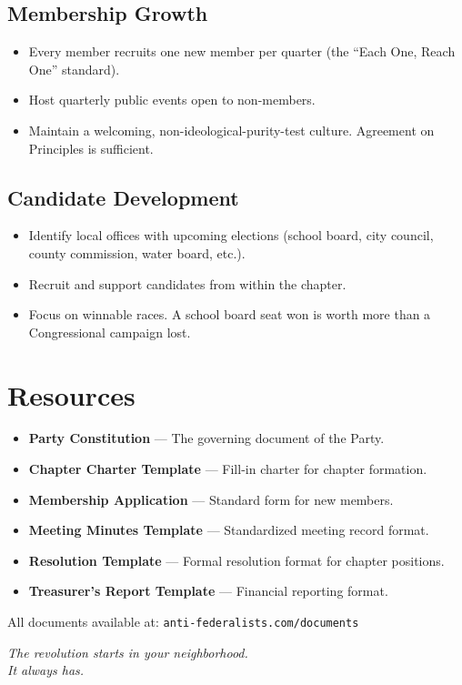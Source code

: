\documentclass[11pt, letterpaper]{article}
\begin{document}
\subsection{Membership Growth}
\begin{itemize}
  \item Every member recruits one new member per quarter (the ``Each One, Reach One'' standard).
  \item Host quarterly public events open to non-members.
  \item Maintain a welcoming, non-ideological-purity-test culture. Agreement on Principles is sufficient.
\end{itemize}

\subsection{Candidate Development}
\begin{itemize}
  \item Identify local offices with upcoming elections (school board, city council, county commission, water board, etc.).
  \item Recruit and support candidates from within the chapter.
  \item Focus on winnable races. A school board seat won is worth more than a Congressional campaign lost.
\end{itemize}


\section{Resources}

\begin{itemize}
  \item \textbf{Party Constitution} --- The governing document of the Party.
  \item \textbf{Chapter Charter Template} --- Fill-in charter for chapter formation.
  \item \textbf{Membership Application} --- Standard form for new members.
  \item \textbf{Meeting Minutes Template} --- Standardized meeting record format.
  \item \textbf{Resolution Template} --- Formal resolution format for chapter positions.
  \item \textbf{Treasurer's Report Template} --- Financial reporting format.
\end{itemize}

\vspace{1em}
All documents available at: \texttt{anti-federalists.com/documents}

\vspace{2cm}


\vspace{1cm}

\begin{center}
  {\itshape\color{afp-gray}\sffamily
    The revolution starts in your neighborhood.\\
    It always has.
  }
\end{center}
\end{document}

